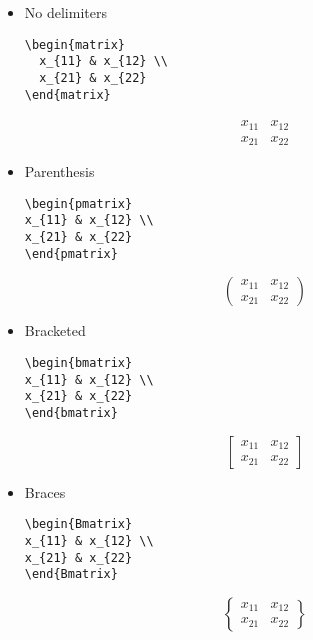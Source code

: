 \documentclass[text,xhtml,itex]{internet}
\begin{document}
\begin{itemize}
\item No delimiters

\begin{verbatim}
\begin{matrix}
  x_{11} & x_{12} \\
  x_{21} & x_{22}
\end{matrix}
\end{verbatim}

\[
\begin{matrix}
  x_{11} & x_{12} \\
  x_{21} & x_{22}
\end{matrix}
\]

\item Parenthesis

\begin{verbatim}
\begin{pmatrix}
x_{11} & x_{12} \\
x_{21} & x_{22}
\end{pmatrix}
\end{verbatim}

\[
\begin{pmatrix}
x_{11} & x_{12} \\
x_{21} & x_{22}
\end{pmatrix}
\]

\item Bracketed

\begin{verbatim}
\begin{bmatrix}
x_{11} & x_{12} \\
x_{21} & x_{22}
\end{bmatrix}
\end{verbatim}

\[
\begin{bmatrix}
x_{11} & x_{12} \\
x_{21} & x_{22}
\end{bmatrix}
\]

\item Braces

\begin{verbatim}
\begin{Bmatrix}
x_{11} & x_{12} \\
x_{21} & x_{22}
\end{Bmatrix}
\end{verbatim}

\[
\begin{Bmatrix}
x_{11} & x_{12} \\
x_{21} & x_{22}
\end{Bmatrix}
\]


\end{itemize}
\end{document}
